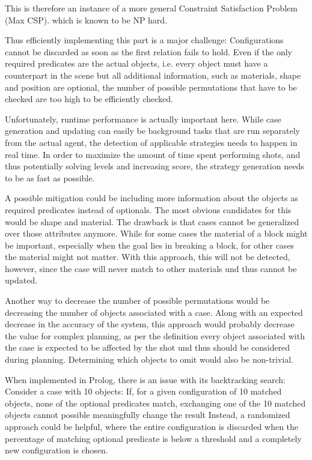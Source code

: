 This is therefore an instance of a more general Constraint Satisfaction Problem (Max CSP). which is known to be NP hard.

Thus efficiently implementing this part is a major challenge:
Configurations cannot be discarded as soon as the first relation fails to hold.
Even if the only required predicates are the actual objects, i.e. every object must have a counterpart in the scene but all additional information, such as materials, shape and position are optional, the number of possible permutations that have to be checked are too high to be efficiently checked.

Unfortunately, runtime performance is actually important here. While case generation and updating can easily be background tasks that are run separately from the actual agent, the detection of applicable strategies needs to happen in real time.
In order to maximize the amount of time spent performing shots, and thus potentially solving levels and increasing score, the strategy generation needs to be as fast as possible.

A possible mitigation could be including more information about the objects as required predicates instead of optionals.
The most obvious candidates for this would be shape and material.
The drawback is that cases cannot be generalized over those attributes anymore. While for some cases the material of a block might be important, especially when the goal lies in breaking a block, for other cases the material might not matter.
With this approach, this will not be detected, however, since the case will never match to other materials und thus cannot be updated.

Another way to decrease the number of possible permutations would be decreasing the number of objects associated with a case. Along with an expected decrease in the accuracy of the system, this approach would probably decrease the value for complex planning, as per the definition every object associated with the case is expected to be affected by the shot und thus should be considered during planning.
Determining which objects to omit would also be non-trivial.

When implemented in Prolog, there is an issue with its backtracking search: Consider a case with 10 objects: If, for a given configuration of 10 matched objects, none of the optional predicates match, exchanging one of the 10 matched objects cannot possible meaningfully change the result
Instead, a randomized approach could be helpful, where the entire configuration is discarded when the percentage of matching optional predicate is below a threshold and a completely new configuration is chosen.

